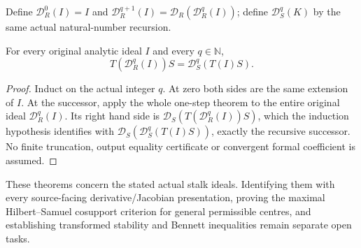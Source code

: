 \begin{definition}
\label{hir:actual-original-iterated-differential-ideal-definition}
\leanok
Define $\mathcal D_R^0(I)=I$ and
$\mathcal D_R^{q+1}(I)=\mathcal D_R(\mathcal D_R^q(I))$;
define $\mathcal D_S^q(K)$ by the same actual natural-number recursion.
\end{definition}

\begin{theorem}
\label{hir:actual-original-all-differential-closure-extension}
\leanok
For every original analytic ideal $I$ and every $q\in\mathbb N$,
\[
 T(\mathcal D_R^q(I))S=\mathcal D_S^q(T(I)S).
\]
\end{theorem}
\begin{proof}
Induct on the actual integer $q$. At zero both sides are the same extension
of $I$. At the successor, apply the whole one-step theorem to the entire
original ideal $\mathcal D_R^q(I)$. Its right hand side is
$\mathcal D_S(T(\mathcal D_R^q(I))S)$, which the induction hypothesis
identifies with $\mathcal D_S(\mathcal D_S^q(T(I)S))$, exactly the recursive
successor. No finite truncation, output equality certificate or convergent
formal coefficient is assumed.
\end{proof}

These theorems concern the stated actual stalk ideals. Identifying them
with every source-facing derivative/Jacobian presentation, proving the
maximal Hilbert--Samuel cosupport criterion for general permissible centres,
and establishing transformed stability and Bennett inequalities remain
separate open tasks.
